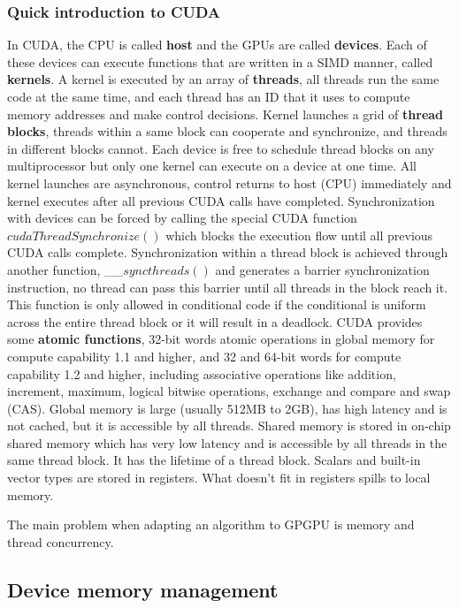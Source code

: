 \documentclass[12pt,journal,compsoc]{IEEEtran}
\begin{document}
\subsubsection{Quick introduction to CUDA}
In CUDA, the CPU is called \textbf{host} and the GPUs are called \textbf{devices}. 
Each of these devices can execute functions that are written in a SIMD manner, called \textbf{kernels}. 
A kernel is executed by an array of \textbf{threads}, all threads run the same code at the same time, and each thread has an ID that it uses to compute memory addresses and make control decisions. 
Kernel launches a grid of \textbf{thread blocks}, threads within a same block can cooperate and synchronize, and threads in different blocks cannot. 
Each device is free to schedule thread blocks on any multiprocessor but only one kernel can execute on a device at one time.
All kernel launches are asynchronous, control returns to host (CPU) immediately and kernel executes after all previous CUDA calls have completed.
Synchronization with devices can be forced by calling the special CUDA function $cudaThreadSynchronize()$ which blocks the execution flow until all previous CUDA calls complete.
Synchronization within a thread block is achieved through another function, \_\_$syncthreads()$ and generates a barrier synchronization instruction, no thread can pass this barrier until all threads in the block reach it.
This function is only allowed in conditional code if the conditional is uniform across the entire thread block or it will result in a deadlock.
CUDA provides some \textbf{atomic functions}, 32-bit words atomic operations in global memory for compute capability 1.1 and higher, and 32 and 64-bit words for compute capability 1.2 and higher, including associative operations like addition, increment, maximum, logical bitwise operations, exchange and compare and swap (CAS).
Global memory is large (usually 512MB to 2GB), has high latency and is not cached, but it is accessible by all threads.
Shared memory is stored in on-chip shared memory which has very low latency and is accessible by all threads in the same thread block.
It has the lifetime of a thread block.
Scalars and built-in vector types are stored in registers. What doesn’t fit in registers spills to local memory.

The main problem when adapting an algorithm to GPGPU is memory and thread concurrency. 

\subsection{Device memory management}
\end{document}
